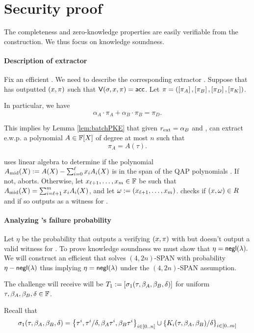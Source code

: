 \documentclass[11pt]{article}
\numberwithin{figure}{section} %
\begin{document}
 
 \section{Security proof}
 The completeness and zero-knowledge properties are easily verifiable from the construction.
 We thus focus on knowledge soundness.
 \paragraph{Description of extractor}
 Fix an efficient \adv. We need to describe the corresponding extractor \ext.
Suppose that \adv has outputted $(x,\pi)$ such that
$\mathsf{V}(\sigma,x,\pi)=\mathsf{acc}$.
Let $\pi=(\left[\pi_A\right],\left[\pi_B\right],\left[\pi_D\right],\left[\pi_K\right])$.
 
 In particular, we have
 \[\alpha_A \cdot \pi_A + \alpha_B \cdot \pi_B  = \pi_D.\]
 
 This implies by Lemma \ref{lem:batchPKE} that given $r_{\mathrm{ext}} =\alpha_B$
 and \advrand, \ext can extract e.w.p. \negl a polynomial $A\in\mathbb F[X]$ of degree at most $n$ such that
 \[\pi_A =A(\tau).\]
 
 \ext uses linear algebra to determine if the polynomial $A_{\mathrm{mid}}(X) := A(X)-\sum_{i=0}^\ell x_i A_i(X)$ is in the span of the QAP polynomials .
 If not, \ext aborts. Otherwise, let $x_{\ell+1},\ldots,x_m \in \mathbb F$ be
 such that $A_{\mathrm{mid}}(X) = \sum_{i=\ell+1}^m x_i A_i(X)$, and let $\omega:= (x_{\ell+1},\ldots,x_m)$.
 \ext checks if $(x,\omega)\in R$ and if so outputs \wit as a witness for \inp.
 
 \paragraph{Analyzing \ext's failure probability}
 
 Let $\eta$ be the probability that \adv outputs a verifying $(x,\pi)$ with but 
 \ext doesn't output a valid witness \wit for \inp.
 To prove knowledge soundness we must show that $\eta=\mathsf{negl}(\lambda).$
 We will construct an efficient \advv
 that solves $(4,2n)$-SPAN with probability $\eta-\mathsf{negl}(\lambda)$ thus implying $\eta=\mathsf{negl}(\lambda)$ under the $(4,2n)$-SPAN assumption.
 
 The challenge \advv will receive will be $T_1:= \left[\sigma_1(\tau,\beta_A,\beta_B,\delta)\right]$
 for uniform $\tau,\beta_A,\beta_B,\delta\in\mathbb F$.
 
 Recall that
 \[\sigma_1(\tau,\beta_A,\beta_B,\delta)= \left\{\tau^i,\tau^i/\delta,\beta_A \tau^i,\beta_B\tau^i\right\}_{i\in[0..n]}\cup \left\{K_i(\tau,\beta_A,\beta_B)/\delta\right\}_{i\in [0..m]}\]
 
\end{document}
